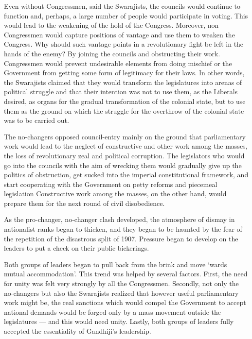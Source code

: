 \begin{multicols}{2}
Even without Congressmen, said the Swarajists, the councils would continue to function and, perhaps, a large number of people would participate in voting. This would lead to the weakening of the hold of the Congress. Moreover, non-Congressmen would capture positions of vantage and use them to weaken the Congress. Why should such vantage points in a revolutionary fight be left in the hands of the enemy? By joining the councils and obstructing their work. Congressmen would prevent undesirable elements from doing mischief or the Government from getting some form of legitimacy for their laws. In other words, the Swarajists claimed that they would transform the legislatures into arenas of political struggle and that their intention was not to use them, as the Liberals desired, as organs for the gradual transformation of the colonial state, but to use them as the ground on which the struggle for the overthrow of the colonial state was to be carried out.

The no-changers opposed council-entry mainly on the ground that parliamentary work would lead to the neglect of constructive and other work among the masses, the loss of revolutionary zeal and political corruption. The legislators who would go into the councils with the aim of wrecking them would gradually give up the politics of obstruction, get sucked into the imperial constitutional framework, and start cooperating with the Government on petty reforms and piecemeal legislation Constructive work among the masses, on the other hand, would prepare them for the next round of civil disobedience.

As the pro-changer, no-changer clash developed, the atmosphere of dismay in nationalist ranks began to thicken, and they began to be haunted by the fear of the repetition of the disastrous split of 1907. Pressure began to develop on the leaders to put a check on their public bickerings.

Both groups of leaders began to pull back from the brink and move `wards mutual accommodation'. This trend was helped by several factors. First, the need for unity was felt very strongly by all the Congressmen. Secondly, not only the no-changers but also the Swarajists realized that however useful parliamentary work might be, the real sanctions which would compel the Government to accept national demands would be forged only by a mass movement outside the legislatures --- and this would need unity. Lastly, both groups of leaders fully accepted the essentiality of Gandhiji's leadership.


\end{multicols}
